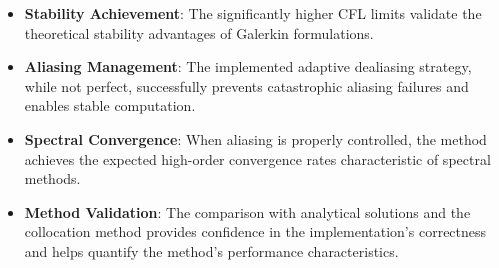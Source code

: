 \begin{itemize}
	\item \textbf{Stability Achievement}: The significantly higher CFL limits validate the theoretical stability advantages of Galerkin formulations.
	\item \textbf{Aliasing Management}: The implemented adaptive dealiasing strategy, while not perfect, successfully prevents catastrophic aliasing failures and enables stable computation.
	\item \textbf{Spectral Convergence}: When aliasing is properly controlled, the method achieves the expected high-order convergence rates characteristic of spectral methods.
	\item \textbf{Method Validation}: The comparison with analytical solutions and the collocation method provides confidence in the implementation's correctness and helps quantify the method's performance characteristics.
\end{itemize}
